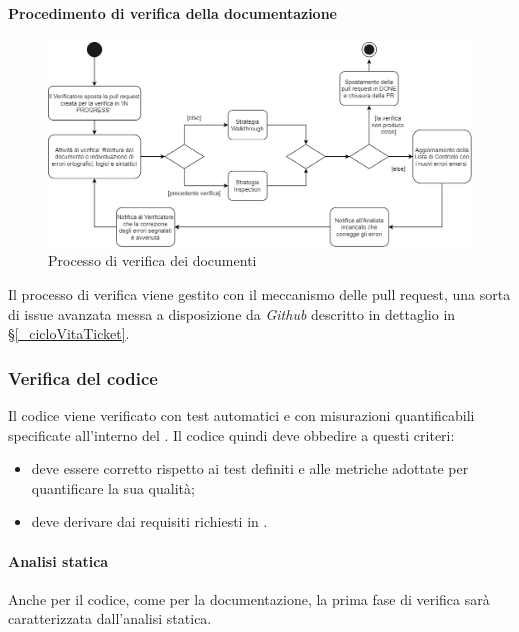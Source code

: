 \paragraph{Procedimento di verifica della documentazione}
\begin{figure}[h!]
    \includegraphics[width=\linewidth]{res/images/processo_verifica.png}
    \caption{Processo di verifica  dei documenti}
\end{figure}
Il processo di verifica viene gestito con il meccanismo delle pull request, una sorta di issue avanzata messa a disposizione da \textit{Github} descritto in dettaglio in \S\ref{_cicloVitaTicket}.

\subsubsection{Verifica del codice} \label{_verificaCodice}
Il codice viene verificato con test automatici e con misurazioni quantificabili specificate all'interno del . Il codice quindi deve obbedire a questi criteri:
\begin{itemize}
    \item deve essere corretto rispetto ai test definiti e alle metriche adottate per quantificare la sua qualità;
    \item deve derivare dai requisiti richiesti in .
\end{itemize}

\paragraph{Analisi statica}
Anche per il codice, come per la documentazione, la prima fase di verifica sarà caratterizzata dall'analisi statica. %

